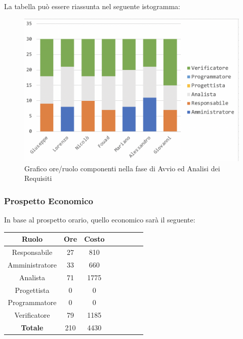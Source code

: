 			La tabella può essere riassunta nel seguente istogramma:
		
			\begin{figure}[H]
				\centering
				\includegraphics[width=0.8\linewidth]{./images/grafo1.png}
				\caption{Grafico ore/ruolo componenti nella fase di Avvio ed Analisi dei Requisiti}
				\label{fig:grafico suddivione ruoli aar}
			\end{figure}
		
			\subsubsection{Prospetto Economico}
			In base al prospetto orario, quello economico sarà il seguente: 
			
			\begin{longtable}{|c|c|c|c|c|c|c|c}
				\hline
				\rowcolor{lighter-grayer}
				\textbf{Ruolo} & \textbf{Ore} & \textbf{Costo} \\
				\hline
				\endfirsthead
				
				\hline
				Responsabile & 27 & 810\\
				\hline
				\hline
				Amministratore & 33 & 660\\
				\hline
				\hline
				Analista & 71 & 1775\\
				\hline
				\hline
				Progettista & 0 & 0\\
				\hline
				\hline
				Programmatore & 0 & 0\\
				\hline
				\hline
				Verificatore & 79 & 1185\\
				\hline
				\textbf{Totale} & 210 & 4430\\
				\hline
			
			\end{longtable}
			\pagebreak
		
